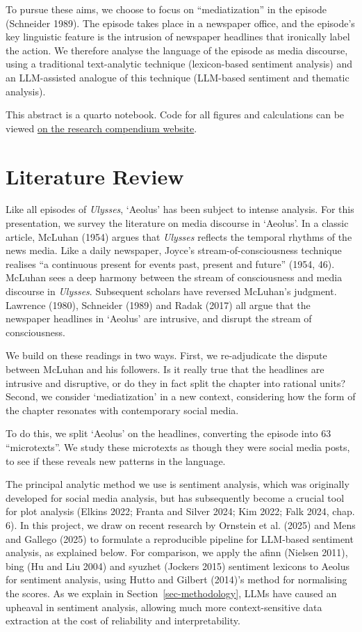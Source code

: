 \documentclass[
  letterpaper,
  DIV=11,
  numbers=noendperiod]{scrartcl}
\begin{document}
To pursue these aims, we choose to focus on ``mediatization'' in the
episode (Schneider 1989). The episode takes place in a newspaper office,
and the episode's key linguistic feature is the intrusion of newspaper
headlines that ironically label the action. We therefore analyse the
language of the episode as media discourse, using a traditional
text-analytic technique (lexicon-based sentiment analysis) and an
LLM-assisted analogue of this technique (LLM-based sentiment and
thematic analysis).

This abstract is a quarto notebook. Code for all figures and
calculations can be viewed
\href{https://uom-digital-studies.github.io/aeolus-microtexts/dh2027/index-preview.html}{on
the research compendium website}.

\section{Literature Review}\label{sec-lit-review}

Like all episodes of \emph{Ulysses}, `Aeolus' has been subject to
intense analysis. For this presentation, we survey the literature on
media discourse in `Aeolus'. In a classic article, McLuhan (1954) argues
that \emph{Ulysses} reflects the temporal rhythms of the news media.
Like a daily newspaper, Joyce's stream-of-consciousness technique
realises ``a continuous present for events past, present and future''
(1954, 46). McLuhan sees a deep harmony between the stream of
consciousness and media discourse in \emph{Ulysses}. Subsequent scholars
have reversed McLuhan's judgment. Lawrence (1980), Schneider (1989) and
Radak (2017) all argue that the newspaper headlines in `Aeolus' are
intrusive, and disrupt the stream of consciousness.

We build on these readings in two ways. First, we re-adjudicate the
dispute between McLuhan and his followers. Is it really true that the
headlines are intrusive and disruptive, or do they in fact split the
chapter into rational units? Second, we consider `mediatization' in a
new context, considering how the form of the chapter resonates with
contemporary social media.

To do this, we split `Aeolus' on the headlines, converting the episode
into 63 ``microtexts''. We study these microtexts as though they were
social media posts, to see if these reveals new patterns in the
language.

The principal analytic method we use is sentiment analysis, which was
originally developed for social media analysis, but has subsequently
become a crucial tool for plot analysis (Elkins 2022; Franta and Silver
2024; Kim 2022; Falk 2024, chap. 6). In this project, we draw on recent
research by Ornstein et al. (2025) and Mens and Gallego (2025) to
formulate a reproducible pipeline for LLM-based sentiment analysis, as
explained below. For comparison, we apply the afinn (Nielsen 2011), bing
(Hu and Liu 2004) and syuzhet (Jockers 2015) sentiment lexicons to
Aeolus for sentiment analysis, using Hutto and Gilbert (2014)'s method
for normalising the scores. As we explain in
Section~\ref{sec-methodology}, LLMs have caused an upheaval in sentiment
analysis, allowing much more context-sensitive data extraction at the
cost of reliability and interpretability.
\end{document}
